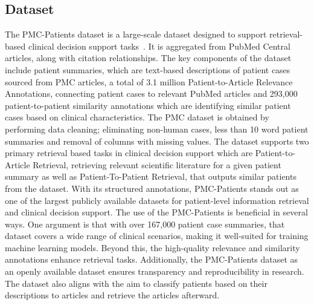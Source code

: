 \subsection{Dataset}
The PMC-Patients dataset is a large-scale dataset designed to support retrieval-based clinical decision support tasks~\cite{Zhao_2023}. It is aggregated from PubMed Central articles, along with citation relationships. The key components of the dataset include patient summaries, which are text-based descriptions of patient cases sourced from PMC articles, a total of 3.1 million Patient-to-Article Relevance Annotations, connecting patient cases to relevant PubMed articles and 293,000 patient-to-patient similarity annotations which are identifying similar patient cases based on clinical characteristics. The PMC dataset is obtained by performing data cleaning; eliminating non-human cases, less than 10 word patient summaries and removal of columns with missing values. The dataset supports two primary retrieval based tasks in clinical decision support which are Patient-to-Article Retrieval, retrieving relevant scientific literature for a given patient summary as well as Patient-To-Patient Retrieval, that outputs similar patients from the dataset. 
With its structured annotations, PMC-Patients stands out as one of the largest publicly available datasets for patient-level information retrieval and clinical decision support.
The use of the PMC-Patients is beneficial in several ways. One argument is that with over 167,000 patient case summaries, that dataset covers a wide range of clinical scenarios, making it well-suited for training machine learning models. Beyond this, the high-quality relevance and similarity annotations enhance retrieval tasks. Additionally, the PMC-Patients dataset as an openly available dataset ensures transparency and reproducibility in research. The dataset also aligns with the aim to classify patients based on their descriptions to articles and retrieve the articles afterward.

